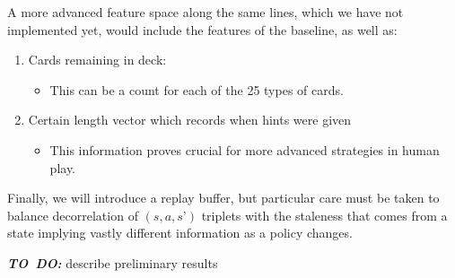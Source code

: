 \documentclass{article}
\newcommand{\todo}{\textbf{\textit{TO~DO: }}}
\begin{document}
A more advanced feature space along the same lines, which we have not implemented yet, would include the features of the baseline, as well as:
\begin{enumerate}
\item Cards remaining in deck:
  \begin{itemize}
  \item This can be a count for each of the 25 types of cards.
  \end{itemize}
\item Certain length vector which records when hints were given
  \begin{itemize}
  \item This information proves crucial for more advanced strategies in human play.
  \end{itemize}
\end{enumerate}


Finally, we will introduce a replay buffer, but particular care must be taken to balance decorrelation of $(s,a,s’)$ triplets with the staleness that comes from a state implying vastly different information as a policy changes.

\todo describe preliminary results





\end{document}

